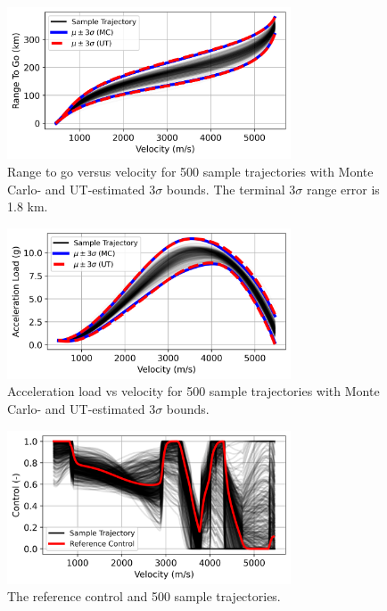 \begin{figure}[h!]
	\centering
	\includegraphics[width=0.75\textwidth]{../PropellantOptimalJournal/ddp/python/Range}
	\caption{Range to go versus velocity for 500 sample trajectories with Monte Carlo- and UT-estimated 3$\sigma$ bounds. The terminal 3$ \sigma $ range error is 1.8 km.}
	\label{fig_mc_range}
\end{figure}
\begin{figure}[h!]
	\centering
	\includegraphics[width=0.75\textwidth]{../PropellantOptimalJournal/ddp/python/Acceleration}
	\caption{Acceleration load vs velocity for 500 sample trajectories with Monte Carlo- and UT-estimated 3$\sigma$ bounds.}
	\label{fig_mc_accel}
\end{figure}
\begin{figure}[h!]
	\centering
	\includegraphics[width=0.75\textwidth]{../PropellantOptimalJournal/ddp/python/Control}
	\caption{The reference control and 500 sample trajectories.}
	\label{fig_mc_control}
\end{figure}

